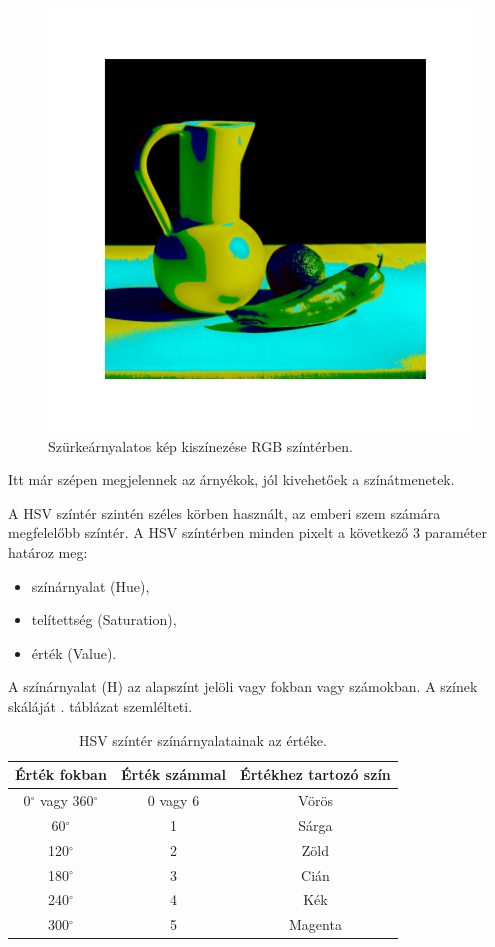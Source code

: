 \begin{figure}[h]
\centering
\includegraphics[scale=0.7]{images/colorized_rgb.png}
\caption{Szürkeárnyalatos kép kiszínezése RGB színtérben.}
\label{fig:colorized_rgb}
\end{figure}

Itt már szépen megjelennek az árnyékok, jól kivehetőek a színátmenetek.


A HSV színtér szintén széles körben használt, az emberi szem számára megfelelőbb színtér. A HSV színtérben minden pixelt a következő 3 paraméter határoz meg:
\begin{itemize}
\item színárnyalat (Hue),
\item telítettség (Saturation),
\item érték (Value).
\end{itemize}

A színárnyalat (H) az alapszínt jelöli vagy fokban vagy számokban. A színek skáláját . táblázat szemlélteti.

\begin{table}[h]
\centering
\caption{HSV színtér színárnyalatainak az értéke.}
\label{tab:hsv_colors}
\medskip
\begin{tabular}{|c|c|c|}
\hline
Érték fokban & Érték számmal & Értékhez tartozó szín \\
\hline
0$^{\circ}$ vagy 360$^{\circ}$ & 0 vagy 6 & Vörös \\
\hline
60$^{\circ}$ & 1 & Sárga \\
\hline
120$^{\circ}$ & 2 & Zöld \\
\hline
180$^{\circ}$ & 3 & Cián \\
\hline
240$^{\circ}$ & 4 & Kék \\
\hline
300$^{\circ}$ & 5 & Magenta \\
\hline
\end{tabular}
\end{table}

